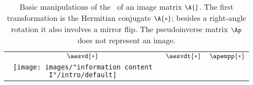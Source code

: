 \begin{table}[htdp]
\caption[Basic manipulations of the \asvd \ of an image]{Basic manipulations of the \asvd \ of an image matrix $\A{}$. The first transformation is the Hermitian conjugate $\A{*}$; besides a right-angle rotation it also involves a mirror flip. The pseudoinverse matrix $\Ap$ does not represent an image.}
\begin{center}
\begin{tabular}{ccc}
%
$\aesvd{*}$ &
$\aesvdt{*}$ &
$\apempp{*}$ \\
%
\texttt{[image: images/"information content I"/intro/default]} &
\raisebox{0.2\height}{\includegraphics[ width = 1.5in ] {images/"information content I"/basics/transpose}} &
\raisebox{0.2\height}{\includegraphics[ width = 1.5in ] {images/"information content I"/basics/mpp}} 
%
\end{tabular}
\end{center}
\label{tab:camille basics}
\end{table}

\endinput